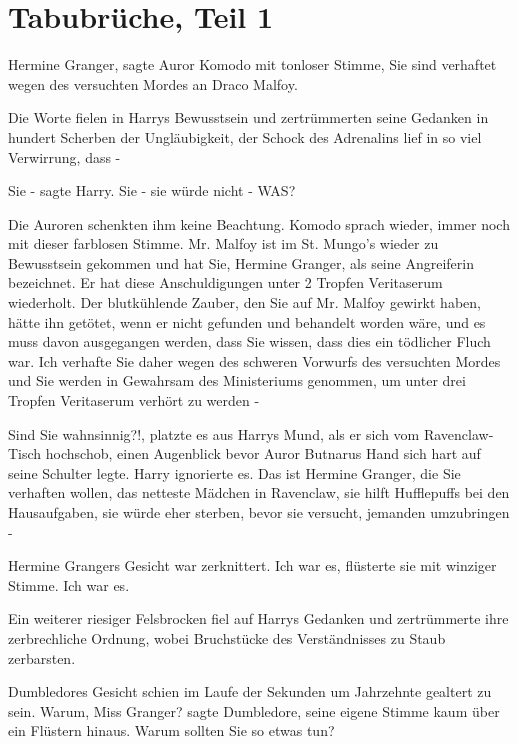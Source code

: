 \chapter{Tabubrüche, Teil 1}

\glqq Hermine Granger\grqq{}, sagte Auror Komodo mit tonloser Stimme, \glqq Sie
sind verhaftet wegen des versuchten Mordes an Draco Malfoy.\grqq{}

Die Worte fielen in Harrys Bewusstsein und zertrümmerten seine Gedanken in
hundert Scherben der Ungläubigkeit, der Schock des Adrenalins lief in so viel
Verwirrung, dass -

\glqq Sie -\grqq{} sagte Harry. \glqq Sie - sie würde nicht - WAS?\grqq{}

Die Auroren schenkten ihm keine Beachtung. Komodo sprach wieder, immer noch mit
dieser farblosen Stimme. \glqq Mr. Malfoy ist im St. Mungo's wieder zu
Bewusstsein gekommen und hat Sie, Hermine Granger, als seine Angreiferin
bezeichnet. Er hat diese Anschuldigungen unter 2 Tropfen Veritaserum wiederholt.
Der blutkühlende Zauber, den Sie auf Mr. Malfoy gewirkt haben, hätte ihn
getötet, wenn er nicht gefunden und behandelt worden wäre, und es muss davon
ausgegangen werden, dass Sie wissen, dass dies ein tödlicher Fluch war. Ich
verhafte Sie daher wegen des schweren Vorwurfs des versuchten Mordes und Sie
werden in Gewahrsam des Ministeriums genommen, um unter drei Tropfen Veritaserum
verhört zu werden -\grqq{}

\glqq Sind Sie wahnsinnig?!\grqq{}, platzte es aus Harrys Mund, als er sich vom
Ravenclaw-Tisch hochschob, einen Augenblick bevor Auror Butnarus Hand sich hart
auf seine Schulter legte. Harry ignorierte es. \glqq Das ist Hermine Granger,
die Sie verhaften wollen, das netteste Mädchen in Ravenclaw, sie hilft
Hufflepuffs bei den Hausaufgaben, sie würde eher sterben, bevor sie versucht,
jemanden umzubringen -\grqq{}

Hermine Grangers Gesicht war zerknittert. \glqq Ich war es\grqq{}, flüsterte sie
mit winziger Stimme. \glqq Ich war es.\grqq{}

Ein weiterer riesiger Felsbrocken fiel auf Harrys Gedanken und zertrümmerte ihre
zerbrechliche Ordnung, wobei Bruchstücke des Verständnisses zu Staub zerbarsten.

Dumbledores Gesicht schien im Laufe der Sekunden um Jahrzehnte gealtert zu sein.
\glqq Warum, Miss Granger?\grqq{} sagte Dumbledore, seine eigene Stimme kaum
über ein Flüstern hinaus. \glqq Warum sollten Sie so etwas tun?\grqq{}

